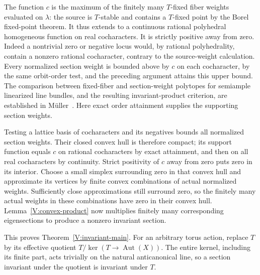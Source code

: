 The function $c$ is the maximum of the finitely many $T$-fixed fiber
weights evaluated on $\lambda$: the source is $T$-stable and contains
a $T$-fixed point by the Borel fixed-point theorem.  It thus extends
to a continuous rational polyhedral homogeneous function on real
cocharacters.  It is strictly positive away from zero.  Indeed a
nontrivial zero or negative locus would, by rational polyhedrality,
contain a nonzero rational cocharacter, contrary to the source-weight
calculation.  Every normalized section weight is bounded above by $c$
on each cocharacter, by the same orbit-order test, and the preceding
argument attains this upper bound.  The comparison between fixed-fiber
and section-weight polytopes for semiample linearized line bundles,
and the resulting invariant-product criterion, are established in
M\"uller~\cite[Proposition~3.13 and Corollary~3.14]{Muller2025}.
Here exact order attainment supplies the supporting section weights.

Testing a lattice basis of cocharacters and its negatives bounds
all normalized section weights.  Their closed convex hull is therefore
compact; its support function equals $c$ on rational cocharacters by
exact attainment, and then on all real cocharacters by continuity.
Strict positivity of $c$ away from zero puts zero in its interior.
Choose a small simplex surrounding zero in that convex hull and
approximate its vertices by finite convex combinations of actual
normalized weights.  Sufficiently close approximations still surround
zero, so the finitely many actual weights in these combinations have
zero in their convex hull.  Lemma~\ref{V:convex-product} now multiplies finitely many corresponding
eigensections to produce a nonzero invariant section.

This proves Theorem~\ref{V:invariant-main}. For an arbitrary torus action, replace $T$ by its effective quotient
$T/\ker(T\to\operatorname{Aut}(X))$. The entire kernel, including
its finite part, acts trivially on the natural anticanonical line, so
a section invariant under the quotient is invariant under $T$.
